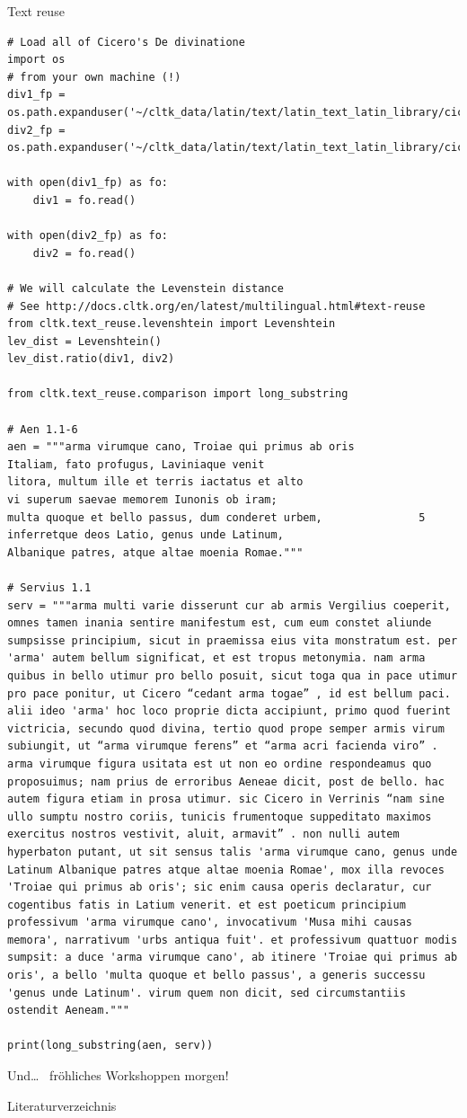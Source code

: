 \documentclass[10pt]{beamer}
\begin{document}
\begin{frame}{Text reuse} 
\begin{verbatim}
# Load all of Cicero's De divinatione
import os
# from your own machine (!)
div1_fp = os.path.expanduser('~/cltk_data/latin/text/latin_text_latin_library/cicero/divinatione1.txt')
div2_fp = os.path.expanduser('~/cltk_data/latin/text/latin_text_latin_library/cicero/divinatione2.txt')

with open(div1_fp) as fo:
    div1 = fo.read()

with open(div2_fp) as fo:
    div2 = fo.read()

# We will calculate the Levenstein distance
# See http://docs.cltk.org/en/latest/multilingual.html#text-reuse
from cltk.text_reuse.levenshtein import Levenshtein
lev_dist = Levenshtein()
lev_dist.ratio(div1, div2)

from cltk.text_reuse.comparison import long_substring

# Aen 1.1-6
aen = """arma virumque cano, Troiae qui primus ab oris
Italiam, fato profugus, Laviniaque venit
litora, multum ille et terris iactatus et alto
vi superum saevae memorem Iunonis ob iram;
multa quoque et bello passus, dum conderet urbem,               5
inferretque deos Latio, genus unde Latinum,
Albanique patres, atque altae moenia Romae."""

# Servius 1.1
serv = """arma multi varie disserunt cur ab armis Vergilius coeperit, omnes tamen inania sentire manifestum est, cum eum constet aliunde sumpsisse principium, sicut in praemissa eius vita monstratum est. per 'arma' autem bellum significat, et est tropus metonymia. nam arma quibus in bello utimur pro bello posuit, sicut toga qua in pace utimur pro pace ponitur, ut Cicero “cedant arma togae” , id est bellum paci. alii ideo 'arma' hoc loco proprie dicta accipiunt, primo quod fuerint victricia, secundo quod divina, tertio quod prope semper armis virum subiungit, ut “arma virumque ferens” et “arma acri facienda viro” . arma virumque figura usitata est ut non eo ordine respondeamus quo proposuimus; nam prius de erroribus Aeneae dicit, post de bello. hac autem figura etiam in prosa utimur. sic Cicero in Verrinis “nam sine ullo sumptu nostro coriis, tunicis frumentoque suppeditato maximos exercitus nostros vestivit, aluit, armavit” . non nulli autem hyperbaton putant, ut sit sensus talis 'arma virumque cano, genus unde Latinum Albanique patres atque altae moenia Romae', mox illa revoces 'Troiae qui primus ab oris'; sic enim causa operis declaratur, cur cogentibus fatis in Latium venerit. et est poeticum principium professivum 'arma virumque cano', invocativum 'Musa mihi causas memora', narrativum 'urbs antiqua fuit'. et professivum quattuor modis sumpsit: a duce 'arma virumque cano', ab itinere 'Troiae qui primus ab oris', a bello 'multa quoque et bello passus', a generis successu 'genus unde Latinum'. virum quem non dicit, sed circumstantiis ostendit Aeneam."""

print(long_substring(aen, serv))
\end{verbatim}
\end{frame}



\begin{frame}[standout]
   \alert{ Und\dots~} fröhliches Workshoppen morgen! ~\alert{\faSmileO}~
\end{frame}

\begin{frame}[allowframebreaks]{Literaturverzeichnis}
\printbibliography
\end{frame}
\end{document}
